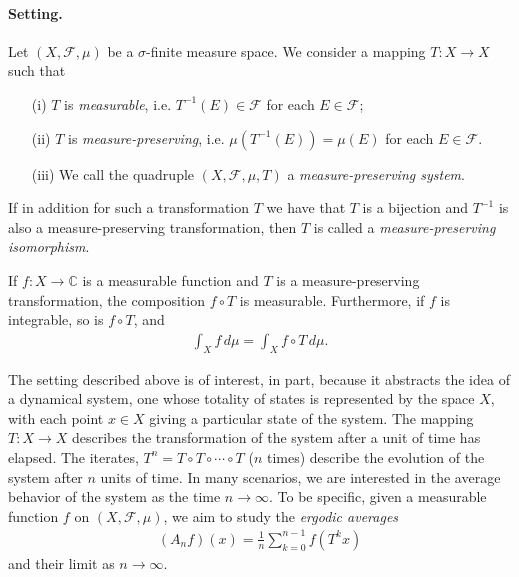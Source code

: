 \documentclass{article}
\numberwithin{equation}{section}
\newcommand{\bbC}{\mathbb{C}}
\newcommand{\scr}{\mathscr}
\theoremstyle{plain}
\theoremstyle{definition}
\begin{document}
\paragraph{Setting.} Let $(X,\scr{F},\mu)$ be a $\sigma$-finite measure space. We consider a mapping $T:X\to X$ such that
\begin{itemize}
	\item[(i)] $T$ is \textit{measurable}, i.e. $T^{-1}(E)\in\scr{F}$ for each $E\in\scr{F}$;
	\item[(ii)] $T$ is \textit{measure-preserving}, i.e. $\mu(T^{-1}(E))=\mu(E)$ for each $E\in\scr{F}$.
	\item[(iii)] We call the quadruple $(X,\scr{F},\mu,T)$ a \textit{measure-preserving system}.
\end{itemize}
If in addition for such a transformation $T$ we have that $T$ is a bijection and $T^{-1}$ is also a measure-preserving transformation, then $T$ is called a \textit{measure-preserving isomorphism}.

If $f:X\to\bbC$ is a measurable function and $T$ is a measure-preserving transformation, the composition $f\circ T$ is measurable. Furthermore, if $f$ is integrable, so is $f\circ T$, and
\begin{align*}
	\int_X f\,d\mu=\int_X f\circ T\,d\mu.
\end{align*}

The setting described above is of interest, in part, because it
abstracts the idea of a dynamical system, one whose totality of states is
represented by the space $X$, with each point $x\in X$ giving a particular
state of the system. The mapping $T:X\to X$ describes the transformation of the system after a unit of time has elapsed. The iterates, $T^n=T\circ T\circ\cdots\circ T$ ($n$ times) describe the evolution of the system after $n$ units of time. In many scenarios, we are interested in the average behavior of the system as the time $n\to\infty$. To be specific, given a measurable function $f$ on $(X,\scr{F},\mu)$, we aim to study the \textit{ergodic averages}
\begin{align*}
	(A_nf)(x)=\frac{1}{n}\sum_{k=0}^{n-1} f(T^kx)
\end{align*}
and their limit as $n\to\infty$.
\end{document}
